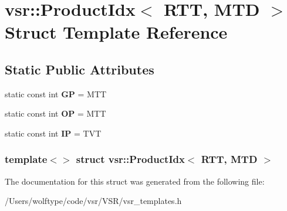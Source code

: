 \hypertarget{structvsr_1_1_product_idx_3_01_r_t_t_00_01_m_t_d_01_4}{\section{vsr\-:\-:Product\-Idx$<$ R\-T\-T, M\-T\-D $>$ Struct Template Reference}
\label{structvsr_1_1_product_idx_3_01_r_t_t_00_01_m_t_d_01_4}
}
\subsection*{Static Public Attributes}
\begin{DoxyCompactItemize}
\item 
\hypertarget{structvsr_1_1_product_idx_3_01_r_t_t_00_01_m_t_d_01_4_aaa9e0601c861b953ae137a487801e979}{static const int {\bfseries G\-P} = M\-T\-T}\label{structvsr_1_1_product_idx_3_01_r_t_t_00_01_m_t_d_01_4_aaa9e0601c861b953ae137a487801e979}

\item 
\hypertarget{structvsr_1_1_product_idx_3_01_r_t_t_00_01_m_t_d_01_4_af6f303fac8875e7c86e0bb8d6d077d81}{static const int {\bfseries O\-P} = M\-T\-T}\label{structvsr_1_1_product_idx_3_01_r_t_t_00_01_m_t_d_01_4_af6f303fac8875e7c86e0bb8d6d077d81}

\item 
\hypertarget{structvsr_1_1_product_idx_3_01_r_t_t_00_01_m_t_d_01_4_ad63351121c204c9d28883b4f7e334fca}{static const int {\bfseries I\-P} = T\-V\-T}\label{structvsr_1_1_product_idx_3_01_r_t_t_00_01_m_t_d_01_4_ad63351121c204c9d28883b4f7e334fca}

\end{DoxyCompactItemize}
\subsubsection*{template$<$$>$ struct vsr\-::\-Product\-Idx$<$ R\-T\-T, M\-T\-D $>$}



The documentation for this struct was generated from the following file\-:\begin{DoxyCompactItemize}
\item 
/\-Users/wolftype/code/vsr/\-V\-S\-R/vsr\-\_\-templates.\-h\end{DoxyCompactItemize}
